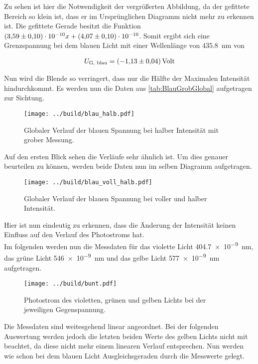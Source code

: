 \noindent Zu sehen ist hier die Notwendigkeit der vergrößerten Abbildung, da der gefittete Bereich so klein ist, dass er im 
Ursprünglichen Diagramm nicht mehr zu erkennen ist. Die gefittete Gerade besitzt die Funktion $\num{3.59\pm0.1 e-10} x + \num{4.07\pm0.1e-10}$. 
Somit ergibt sich eine Grenzspannung bei dem blauen Licht mit einer Wellenlänge von \qty{435.8}{\nano\meter} von 

\begin{align}
    U_{\text{G, blau}} = \qty{-1.13\pm0.04}{Volt}
\end{align}

\noindent Nun wird die Blende so verringert, dass nur die Hälfte der Maximalen Intensität hindurchkommt. Es werden nun die Daten 
aus \ref{tab:BlauGrobGlobal} aufgetragen zur Sichtung.

\begin{figure}[H]
    \centering
    \texttt{[image: ../build/blau\_halb.pdf]}
    \caption{Globaler Verlauf der blauen Spannung bei halber Intensität mit grober Messung.}
\end{figure}

\noindent Auf den ersten Blick sehen die Verläufe sehr ähnlich ist. Um dies genauer beurteilen zu können, werden beide Daten nun 
im selben Diagramm aufgetragen.

\begin{figure}[H]
    \centering
    \texttt{[image: ../build/blau\_voll\_halb.pdf]}
    \caption{Globaler Verlauf der blauen Spannung bei voller und halber Intensität.}
\end{figure}

\noindent Hier ist nun eindeutig zu erkennen, dass die Änderung der Intensität keinen Einfluss auf den Verlauf des Photostroms hat.\\
\noindent Im folgenden werden nun die Messdaten für das violette Licht \qty{404.7e-9}{\nano\meter}, das grüne Licht \qty{546e-9}{\nano\meter} 
und das gelbe Licht \qty{577e-9}{\nano\meter} aufgetragen. 


\begin{figure}[H]
    \centering
    \texttt{[image: ../build/bunt.pdf]}
    \caption{Photostrom des violetten, grünen und gelben Lichts bei der jeweiligen Gegenspannung.}
\end{figure}

\noindent Die Messdaten sind weitesgehend linear angeordnet. Bei der folgenden Auswertung werden jedoch die letzten beiden Werte des 
gelben Lichts nicht mit beachtet, da diese nicht mehr einem linearen Verlauf entsprechen. Nun werden wie schon bei dem blauen Licht 
Ausgleichsgeraden durch die Messwerte gelegt.

